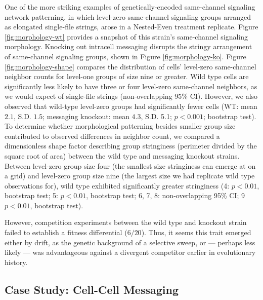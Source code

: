 One of the more striking examples of genetically-encoded same-channel signaling network patterning, in which level-zero same-channel signaling groups arranged as elongated single-file strings, arose in a Nested-Even treatment replicate.
Figure \ref{fig:morphology-wt} provides a snapshot of this strain's same-channel signaling morphology.
Knocking out intracell messaging disrupts the stringy arrangement of same-channel signaling groups, shown in Figure \ref{fig:morphology-ko}.
Figure \ref{fig:morphology-shape} compares the distribution of cells' level-zero same-channel neighbor counts for level-one groups of size nine or greater.
Wild type cells are significantly less likely to have three or four level-zero same-channel neighbors, as we would expect of single-file strings (non-overlapping 95\% CI).
However, we also observed that wild-type level-zero groups had significantly fewer cells
(WT: mean $2.1$, S.D. $1.5$; messaging knockout: mean $4.3$, S.D. 5.1; $p < 0.001$; bootstrap test).
To determine whether morphological patterning besides smaller group size contributed to observed differences in neighbor count, we compared a dimensionless shape factor describing group stringiness (perimeter divided by the square root of area) between the wild type and messaging knockout strains.
Between level-zero group size four (the smallest size stringiness can emerge at on a grid) and level-zero group size nine (the largest size we had replicate wild type observations for), wild type exhibited significantly greater stringiness
(4: $p < 0.01$, bootstrap test; 5: $p < 0.01$, bootstrap test; 6, 7, 8: non-overlapping 95\% CI; 9 $p < 0.01$, bootstrap test).

However, competition experiments between the wild type and knockout strain failed to establish a fitness differential ($6/20$).
Thus, it seems this trait emerged either by drift, as the genetic background of a selective sweep, or --- perhaps less likely --- was advantageous against a divergent competitor earlier in evolutionary history.

\subsection{Case Study: Cell-Cell Messaging} \label{sec:intergroup}



